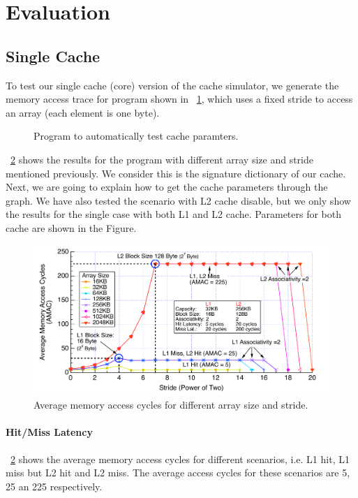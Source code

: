 \documentclass[12pt]{report}
\newcommand{\Fig}[1]{\figurename~\ref{#1}}
\begin{document}
\newpage
\section{Evaluation}
\subsection{Single Cache}
\label{single_cache}
To test our single cache (core) version of the cache simulator, we generate the memory access trace for program shown in \Fig{fig:autotest}, which uses a fixed stride to access an array (each element is one byte). 

\begin{figure}[ht]

\caption{Program to automatically test cache paramters.}
\label{fig:autotest}
\end{figure}

\Fig{fig:autotest_result} shows the results for the program with different array size and stride mentioned previously. We consider this is the signature dictionary of our cache. Next, we are going to explain how to get the cache parameters through the graph. We have also tested the scenario with L2 cache disable, but we only show the results for the single case with both L1 and L2 cache. Parameters for both cache are shown in the Figure.

\begin{figure}[!h]
\begin{minipage}[b]{\textwidth}
 \centering
 \includegraphics[trim=0mm 0mm 0mm 0mm,clip,width=\linewidth]{figs/autotest.pdf}
 \caption{Average memory access cycles for different array size and stride.}
 \label{fig:autotest_result}
\end{minipage}
\end{figure}

\paragraph{Hit/Miss Latency}
\Fig{fig:autotest_result} shows the average memory access cycles for different scenarios, i.e. L1 hit, L1 miss but L2 hit and L2 miss. The average access cycles for these scenarios are 5, 25 an 225 respectively. 
\end{document}

